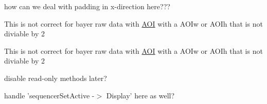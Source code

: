 
\begin{DoxyRefList}
\item[\label{todo__todo000001}%
\hypertarget{todo__todo000001}{}%
成员 \hyperlink{class_image_canvas_aba3902aa128ee939ee26665cf9742d5d}{Image\+Canvas\+:\+:Set\+Image} (const mv\+I\+M\+P\+A\+C\+T\+::acquire\+::\+Image\+Buffer $\ast$p\+I\+B, bool bo\+Must\+Refresh=true)]how can we deal with padding in x-\/direction here???  
\item[\label{todo__todo000002}%
\hypertarget{todo__todo000002}{}%
成员 \hyperlink{class_line_profile_canvas_horizontal_ad668720e03d2799e26a82a9bc235e405}{Line\+Profile\+Canvas\+Horizontal\+:\+:Calculate\+Data} (const \hyperlink{struct_image_buffer}{Image\+Buffer} $\ast$p\+I\+B, const T\+Bayer\+Mosaic\+Parity bayer\+Parity)]This is not correct for bayer raw data with \hyperlink{struct_a_o_i}{A\+O\+I} with a A\+O\+Iw or A\+O\+Ih that is not diviable by 2  
\item[\label{todo__todo000003}%
\hypertarget{todo__todo000003}{}%
成员 \hyperlink{class_line_profile_canvas_vertical_a66740734a1cb3885d959d5f248eb6d6e}{Line\+Profile\+Canvas\+Vertical\+:\+:Calculate\+Data} (const \hyperlink{struct_image_buffer}{Image\+Buffer} $\ast$p\+I\+B, const T\+Bayer\+Mosaic\+Parity bayer\+Parity)]This is not correct for bayer raw data with \hyperlink{struct_a_o_i}{A\+O\+I} with a A\+O\+Iw or A\+O\+Ih that is not diviable by 2  
\item[\label{todo__todo000004}%
\hypertarget{todo__todo000004}{}%
成员 \hyperlink{class_prop_grid_frame_base_a0afb2cdd3da1a2844d2c3a89ef6be719}{Prop\+Grid\+Frame\+Base\+:\+:On\+Property\+Right\+Clicked} (wx\+Property\+Grid\+Event \&e)]disable read-\/only methods later?  
\item[\label{todo__todo000005}%
\hypertarget{todo__todo000005}{}%
成员 \hyperlink{class_prop_view_frame_ad015438bd5479213972cccde44c3e727}{Prop\+View\+Frame\+:\+:On\+Image\+Skipped} (wx\+Command\+Event \&e)]handle 'sequencer\+Set\+Active -\/$>$ Display' here as well? 
\end{DoxyRefList}